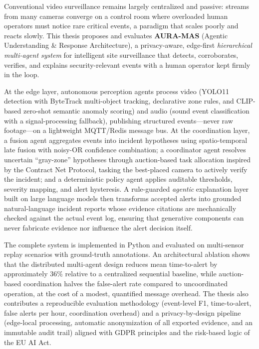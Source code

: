 \documentclass[openany,12pt,oneside]{extreport}
\begin{document}
Conventional video surveillance remains largely centralized and passive: streams from many cameras converge on a control room where overloaded human operators must notice rare critical events, a paradigm that scales poorly and reacts slowly. This thesis proposes and evaluates \textbf{AURA-MAS} (Agentic Understanding \& Response Architecture), a privacy-aware, edge-first \emph{hierarchical multi-agent system} for intelligent site surveillance that detects, corroborates, verifies, and explains security-relevant events with a human operator kept firmly in the loop.

At the edge layer, autonomous perception agents process video (YOLO11 detection with ByteTrack multi-object tracking, declarative zone rules, and CLIP-based zero-shot semantic anomaly scoring) and audio (sound event classification with a signal-processing fallback), publishing structured events---never raw footage---on a lightweight MQTT/Redis message bus. At the coordination layer, a fusion agent aggregates events into incident hypotheses using spatio-temporal late fusion with noisy-OR confidence combination; a coordinator agent resolves uncertain ``gray-zone'' hypotheses through auction-based task allocation inspired by the Contract Net Protocol, tasking the best-placed camera to actively verify the incident; and a deterministic policy agent applies auditable thresholds, severity mapping, and alert hysteresis. A rule-guarded \emph{agentic} explanation layer built on large language models then transforms accepted alerts into grounded natural-language incident reports whose evidence citations are mechanically checked against the actual event log, ensuring that generative components can never fabricate evidence nor influence the alert decision itself.

The complete system is implemented in Python and evaluated on multi-sensor replay scenarios with ground-truth annotations. An architectural ablation shows that the distributed multi-agent design reduces mean time-to-alert by approximately 36\% relative to a centralized sequential baseline, while auction-based coordination halves the false-alert rate compared to uncoordinated operation, at the cost of a modest, quantified message overhead. The thesis also contributes a reproducible evaluation methodology (event-level F1, time-to-alert, false alerts per hour, coordination overhead) and a privacy-by-design pipeline (edge-local processing, automatic anonymization of all exported evidence, and an immutable audit trail) aligned with GDPR principles and the risk-based logic of the EU AI Act.
\end{document}
